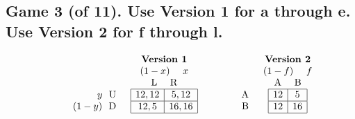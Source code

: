 \documentclass[11pt]{article}
\begin{document}
\pagebreak

\subsection*{Game 3 (of 11). Use Version 1 for a through e. Use Version 2 for f through l.
}
$$
\begin{array}{lcr}
\begin{array}{lccc}
    & & & \textbf{Version 1} \\
    & & & (1-x) \ \ \ \ x\\
    & & & \text{L} \ \ \ \ \text{R}\\
    & &
    \begin{array}{r}
        y \ \ \text{U} \\
        (1-y) \ \ \text{D} \\
    \end{array} &
    \begin{array}{|c|c|}
        \hline
        12,12 & 5,12 \\
        \hline
        12,5 & 16,16 \\
        \hline
    \end{array}
\end{array}
&
\begin{array}{lccc}
    & & & \textbf{Version 2} \\
    & & & (1-f) \ \ \ \ f\\
    & & & \text{A} \ \ \ \ \text{B}\\
    & &
    \begin{array}{r}
        \text{A} \\
        \text{B} \\
    \end{array} &
    \begin{array}{|c|c|}
        \hline
        12 & 5 \\
        \hline
        12 & 16 \\
        \hline
    \end{array}
\end{array}
\end{array}
$$
\end{document}
